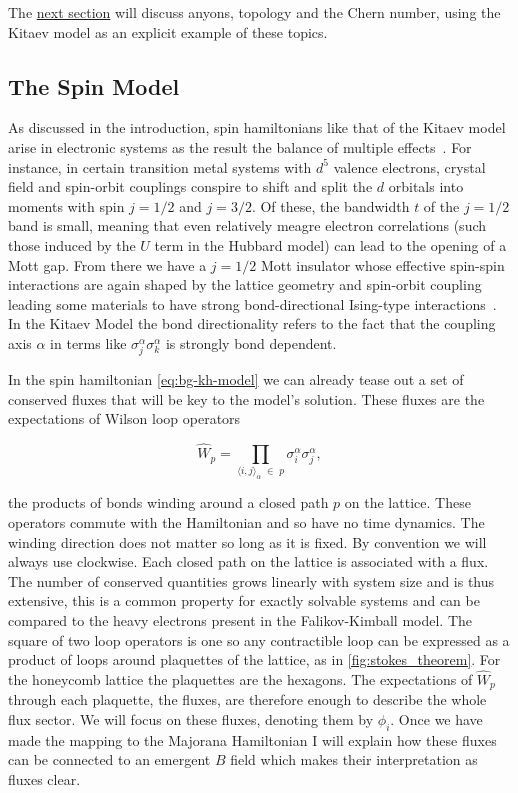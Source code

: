 The \protect\hyperlink{anyonic-statistics}{next section} will discuss anyons, topology and the Chern number, using the Kitaev model as an explicit example of these topics.

\hypertarget{the-spin-model}{%
\subsection{The Spin Model}\label{the-spin-model}}

As discussed in the introduction, spin hamiltonians like that of the Kitaev model arise in electronic systems as the result the balance of multiple effects~\autocite{TrebstPhysRep2022}. For instance, in certain transition metal systems with \(d^5\) valence electrons, crystal field and spin-orbit couplings conspire to shift and split the \(d\) orbitals into moments with spin \(j = 1/2\) and \(j = 3/2\). Of these, the bandwidth \(t\) of the \(j= 1/2\) band is small, meaning that even relatively meagre electron correlations (such those induced by the \(U\) term in the Hubbard model) can lead to the opening of a Mott gap. From there we have a \(j = 1/2\) Mott insulator whose effective spin-spin interactions are again shaped by the lattice geometry and spin-orbit coupling leading some materials to have strong bond-directional Ising-type interactions~\autocite{jackeliMottInsulatorsStrong2009,khaliullinOrbitalOrderFluctuations2005}. In the Kitaev Model the bond directionality refers to the fact that the coupling axis \(\alpha\) in terms like \(\sigma_j^{\alpha}\sigma_k^{\alpha}\) is strongly bond dependent.

In the spin hamiltonian \cref{eq:bg-kh-model} we can already tease out a set of conserved fluxes that will be key to the model's solution. These fluxes are the expectations of Wilson loop operators

\[\hat{W}_p = \prod_{\langle i,j\rangle_\alpha\; \in\; p} \sigma_i^{\alpha}\sigma_j^{\alpha},\]

the products of bonds winding around a closed path \(p\) on the lattice. These operators commute with the Hamiltonian and so have no time dynamics. The winding direction does not matter so long as it is fixed. By convention we will always use clockwise. Each closed path on the lattice is associated with a flux. The number of conserved quantities grows linearly with system size and is thus extensive, this is a common property for exactly solvable systems and can be compared to the heavy electrons present in the Falikov-Kimball model. The square of two loop operators is one so any contractible loop can be expressed as a product of loops around plaquettes of the lattice, as in \cref{fig:stokes_theorem}. For the honeycomb lattice the plaquettes are the hexagons. The expectations of \(\hat{W}_p\) through each plaquette, the fluxes, are therefore enough to describe the whole flux sector. We will focus on these fluxes, denoting them by \(\phi_i\). Once we have made the mapping to the Majorana Hamiltonian I will explain how these fluxes can be connected to an emergent \(B\) field which makes their interpretation as fluxes clear.

